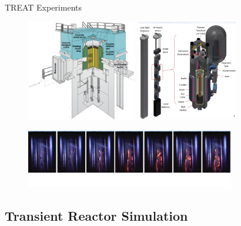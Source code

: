 \documentclass[8pt,xcolor=dvipnames]{beamer}
\begin{document}
\begin{frame}{TREAT Experiments}

\begin{figure}
\includegraphics[height=1.75in]{figures/Treat_cutaway.png}
\hspace{0.5in}
\includegraphics[height=1.75in]{figures/multi_sertta.png}
\end{figure}

\begin{figure}
\includegraphics[height=1in]{figures/Treat_melt.png}
\end{figure}

\end{frame}

\subsection{Transient Reactor Simulation}
\end{document}

